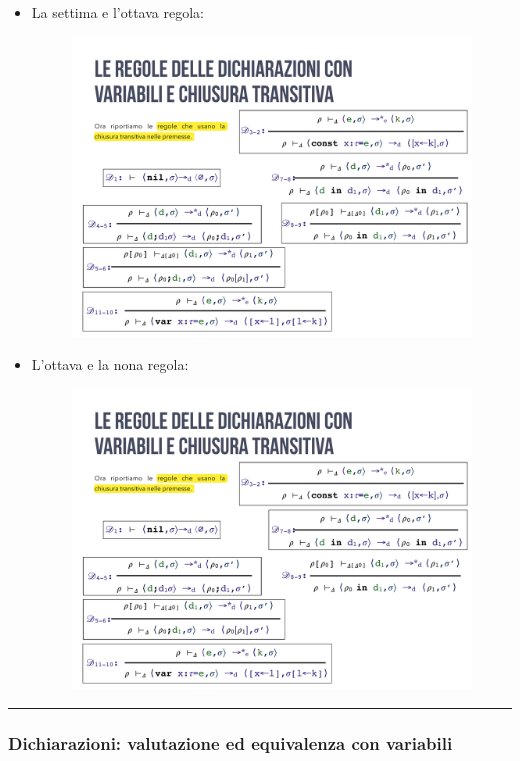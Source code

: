 \documentclass[a4paper]{article}
\newcommand{\longline}{\noindent\rule{\textwidth}{0.4pt}}
\begin{document}
\begin{itemize}
 		\item La settima e l'ottava regola:
 		\begin{figure}[!htp]
 			\centering
 			\includegraphics[width=.8\textwidth]{img/regola_dichiarazione-up-transitiva-7_8.pdf}
 		\end{figure}\newpage
 		
 		\item L'ottava e la nona regola:
 		\begin{figure}[!htp]
 			\centering
 			\includegraphics[width=.8\textwidth]{img/regola_dichiarazione-up-transitiva-8_9.pdf}
 		\end{figure}
 	\end{itemize}
 
 	\longline
 	
 	\subsubsection{Dichiarazioni: valutazione ed equivalenza con variabili}
 	
\end{document}
